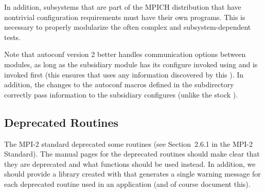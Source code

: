 \documentclass{article}
\begin{document}
In addition, subsystems that are part of the MPICH distribution that have
nontrivial configuration requirements must have their own 
programs.  This is necessary to properly modularize the often complex and
subsystem-dependent tests.

Note that autoconf version 2 better handles communication options between
modules, as long as the subsidiary module has its configure invoked using
 and  is invoked first
(this ensures that  uses any information
discovered by this ).  In addition, the changes to the autoconf
macros defined in the  subdirectory correctly pass
information to the subsidiary configures (unlike the stock
).

\subsection{Deprecated Routines}

The MPI-2 standard deprecated some routines (see Section~2.6.1 in the MPI-2
Standard).  The manual pages for the deprecated routines should make clear
that they are deprecated and what functions should be used instead.  In
addition, we should provide a library created with  that
generates a single warning message for each deprecated routine used in an
application (and of course document this).


%
\end{document}
